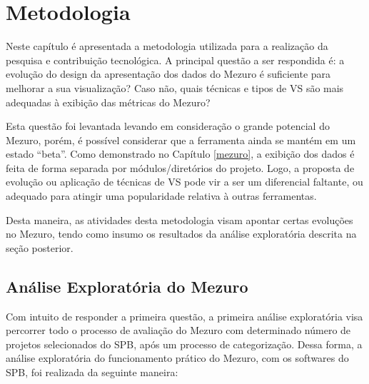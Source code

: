 \chapter{Metodologia}\label{metodologia}

Neste capítulo é apresentada a metodologia utilizada para a
realização da pesquisa e contribuição tecnológica. A principal questão
a ser respondida é: a evolução do design da apresentação dos dados do Mezuro
é suficiente para melhorar a sua visualização? Caso não, quais técnicas e
tipos de VS são mais adequadas à exibição das métricas do Mezuro?

Esta questão foi levantada levando em consideração o grande potencial do Mezuro,
porém, é possível considerar que a ferramenta ainda se mantém em um estado
``beta''. Como demonstrado no Capítulo \ref{mezuro}, a exibição dos dados é
feita de forma separada por módulos/diretórios do projeto. Logo, a proposta de
evolução ou aplicação de técnicas de VS pode vir a ser um diferencial faltante,
ou adequado para atingir uma popularidade relativa à outras ferramentas.

Desta maneira, as atividades desta metodologia visam apontar certas
evoluções no Mezuro, tendo como insumo os resultados da análise exploratória
descrita na seção posterior.

\section{Análise Exploratória do Mezuro}

Com intuito de responder a primeira questão, a primeira análise exploratória
visa percorrer todo o processo de avaliação do Mezuro com determinado número
de projetos selecionados do SPB, após um processo de categorização.
%
Dessa forma, a análise exploratória do funcionamento prático do Mezuro, com os
softwares do SPB, foi realizada da seguinte maneira:



